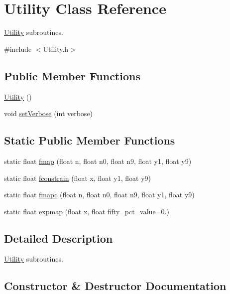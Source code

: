 \hypertarget{class_utility}{}\section{Utility Class Reference}
\label{class_utility}


\mbox{\hyperlink{class_utility}{Utility}} subroutines.  




{\ttfamily \#include $<$Utility.\+h$>$}

\subsection*{Public Member Functions}
\begin{DoxyCompactItemize}
\item 
\mbox{\hyperlink{class_utility_ac7af3e1642ac8d53ef180180a08fbd00}{Utility}} ()
\item 
void \mbox{\hyperlink{class_utility_a46bd6f349ac360fa663dce98a102c805}{set\+Verbose}} (int verbose)
\end{DoxyCompactItemize}
\subsection*{Static Public Member Functions}
\begin{DoxyCompactItemize}
\item 
static float \mbox{\hyperlink{class_utility_ad35eff6790f16f4afcd546cb5de861c2}{fmap}} (float n, float n0, float n9, float y1, float y9)
\item 
static float \mbox{\hyperlink{class_utility_af50f94cc1c9126f9f2334686158f617f}{fconstrain}} (float x, float y1, float y9)
\item 
static float \mbox{\hyperlink{class_utility_abee51df02bf586bd7d6bc36481152402}{fmapc}} (float n, float n0, float n9, float y1, float y9)
\item 
static float \mbox{\hyperlink{class_utility_ae1259b03eaff875dfb05b040a6fb11b1}{expmap}} (float x, float fifty\+\_\+pct\+\_\+value=0.)
\end{DoxyCompactItemize}


\subsection{Detailed Description}
\mbox{\hyperlink{class_utility}{Utility}} subroutines. 



\subsection{Constructor \& Destructor Documentation}
\mbox{\label{class_utility_ac7af3e1642ac8d53ef180180a08fbd00}} 
